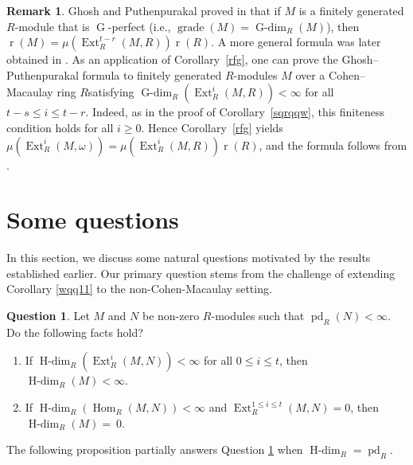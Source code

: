 \documentclass[11pt, a4paper,pagebackref]{amsart}
\numberwithin{equation}{section}
\theoremstyle{definition}
\newtheorem{remark}[theorem]{Remark}
\newtheorem{remark and definition}[theorem]{Remark and Definition}
\newtheorem{remark and notation}[theorem]{Remark and Notation}
\newtheorem{question}[theorem]{Question}
\newcommand\Hom{\operatorname{Hom}}
\newcommand\Ext{\operatorname{Ext}}
\DeclareMathOperator{\type}{r}
\begin{document}
\begin{remark}\label{rmkGhoshP}
    Ghosh and Puthenpurakal proved in \cite[Theorem 3.5]{GorensteinringsviahomologicaldimensionsandsymmetryinvanishingofExtandTatecohomology}
that if \(M\) is a finitely generated \(R\)-module that is \(\operatorname{G}\)-perfect
(i.e., \(\operatorname{grade}(M)=\operatorname{G\text{-}dim}_R(M)\)), then $\type(M)=\mu(\Ext^{t-r}_R(M,R))\type(R)$.
A more general formula was later obtained in \cite[Theorem (A)]{NumericalApectsofComplexesOfFiniteHomologicalDimensions}. As an application of Corollary~\ref{rfg}, one can prove the Ghosh--Puthenpurakal formula
to finitely generated $R$-modules $M$ over a Cohen--Macaulay ring $R$satisfying
$\operatorname{G\text{-}dim}_R(\Ext_R^i(M,R))<\infty$ for all $t-s\le i\le t-r$.
Indeed, as in the proof of Corollary~\ref{sqrqqw}, this finiteness condition holds for all $i\geq 0$.
Hence Corollary~\ref{rfg} yields $\mu(\Ext_R^i(M,\omega))=\mu(\Ext_R^i(M,R))\type(R)$, and the formula follows from \cite[Theorem 3.1]{FH}.
\end{remark}







\section{Some questions}\label{sectionsquestions}
In this section, we discuss some natural questions motivated by the results established earlier. Our primary question stems from the challenge of extending Corollary \ref{wqq11} to the non-Cohen-Macaulay setting.


\begin{question}\label{12qaz}
     Let $M$ and $N$ be non-zero $R$-modules such that $\operatorname{pd}_R(N)<\infty$. Do the following facts hold?
    \begin{enumerate}[\rm(1)]
        \item If $\operatorname{H-dim}_R(\Ext_R^i(M,N))<\infty$ for all $0\leq i \leq t$, then $\operatorname{H-dim}_R(M)<\infty$.
        \item If $\operatorname{H-dim}_R(\Hom_R(M,N))<\infty$ and $\Ext_R^{1\leq i \leq t}(M,N)=0$, then $\operatorname{H-dim}_R (M)=~0$.
    \end{enumerate}
\end{question}

The following proposition partially answers Question \ref{12qaz} when $\operatorname{H\text{-}dim}_R = \operatorname{pd}_R$.
\end{document}
